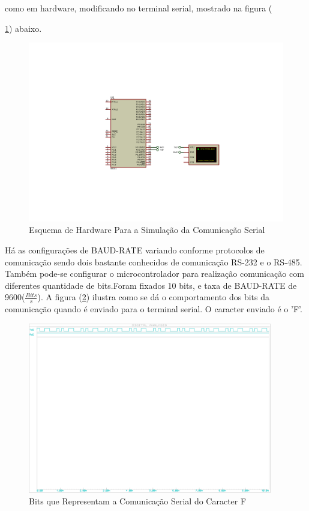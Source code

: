 \documentclass{Fabiano_file}
\begin{document}
como em hardware, modificando no terminal serial, mostrado na figura ({\ref{fig:serial_80c51}) abaixo.

\begin{figure}[h!]
\centering
\includegraphics[width=1.2\textwidth]{serial_80c51.pdf}
\caption{Esquema de Hardware Para a Simulação da Comunicação Serial}
\label{fig:serial_80c51}
\end{figure}

\pagebreak

Há  as configurações de BAUD-RATE variando conforme protocolos de comunicação sendo dois bastante conhecidos de comunicação RS-232 e o RS-485.
Também pode-se configurar o microcontrolador para realização comunicação com diferentes quantidade de bits.Foram fixados 10 bits, e taxa de BAUD-RATE de 9600($\frac{Bits}{s}$).
A figura (\ref{fig:enviando_um_caracter_continuamente}) ilustra como se dá o comportamento dos bits da comunicação quando é enviado para o terminal serial.
O caracter enviado é o 'F'.

\begin{figure}[h!]
\centering
\includegraphics[width=0.95\textwidth]{enviando_um_caracter_continuamente.pdf}
\caption{Bits que Representam a Comunicação Serial do Caracter F}
\label{fig:enviando_um_caracter_continuamente}
\end{figure}

}
\end{document}
